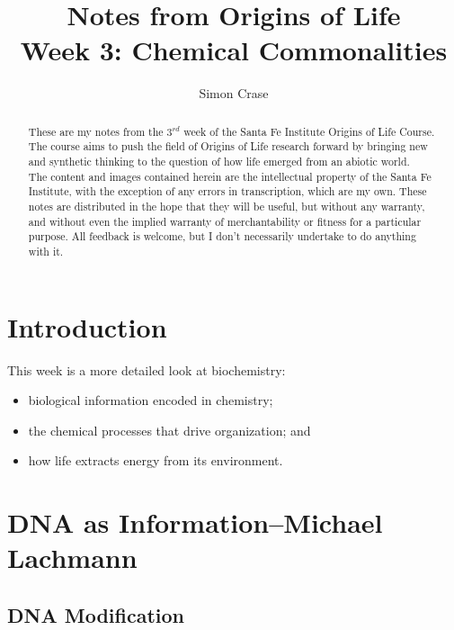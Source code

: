 \documentclass[]{article}
\title{
	Notes from Origins of Life\\
	Week 3: Chemical Commonalities
}
\author{Simon Crase}
\begin{document}
\maketitle

\begin{abstract}
 	These are my notes from the $3^{rd}$ week of the Santa Fe Institute Origins of Life Course\cite{sfi2020}. The course aims to push the field of Origins of Life research forward by bringing new and synthetic thinking to the question of how life emerged from an abiotic world.\\
  	The content and images contained herein are the intellectual property of the Santa Fe Institute, with the exception of any errors in transcription, which are my own.
  	These notes are distributed in the hope that they will be useful,
  	but without any warranty, and without even the implied warranty of
  	merchantability or fitness for a particular purpose. All feedback is welcome,
  	but I don't necessarily undertake to do anything with it.
\end{abstract}

\setcounter{tocdepth}{2}
\tableofcontents

\listoffigures
\listoftables

\section{Introduction}

This week is a more detailed look at biochemistry:\begin{itemize}
	\item  biological information encoded in chemistry;
	\item the chemical processes that drive organization; and
	\item  how life extracts energy from its environment.
\end{itemize}

\section[DNA as Information]{DNA as Information--Michael Lachmann}

\subsection{DNA Modification}
\end{document}
